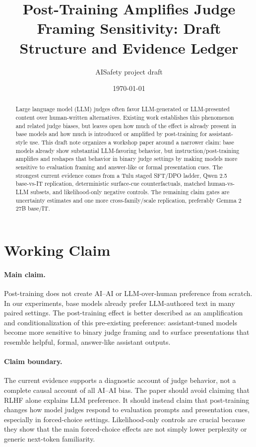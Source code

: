 \documentclass[11pt]{article}
\title{Post-Training Amplifies Judge Framing Sensitivity: Draft Structure and Evidence Ledger}
\author{AISafety project draft}
\date{\today}
\begin{document}
\maketitle

\begin{abstract}
Large language model (LLM) judges often favor LLM-generated or LLM-presented
content over human-written alternatives. Existing work establishes this
phenomenon and related judge biases, but leaves open how much of the effect is
already present in base models and how much is introduced or amplified by
post-training for assistant-style use. This draft note organizes a workshop
paper around a narrower claim: base models already show substantial
LLM-favoring behavior, but instruction/post-training amplifies and reshapes
that behavior in binary judge settings by making models more sensitive to
evaluation framing and answer-like or formal presentation cues. The strongest
current evidence comes from a Tulu staged SFT/DPO ladder, Qwen 2.5 base-vs-IT
replication, deterministic surface-cue counterfactuals, matched
human-vs-LLM subsets, and likelihood-only negative controls. The remaining
claim gates are uncertainty estimates and one more cross-family/scale
replication, preferably Gemma 2 27B base/IT.
\end{abstract}

\section{Working Claim}

\paragraph{Main claim.}
Post-training does not create AI--AI or LLM-over-human preference from
scratch. In our experiments, base models already prefer LLM-authored text in
many paired settings. The post-training effect is better described as an
amplification and conditionalization of this pre-existing preference:
assistant-tuned models become more sensitive to binary judge framing and to
surface presentations that resemble helpful, formal, answer-like assistant
outputs.

\paragraph{Claim boundary.}
The current evidence supports a diagnostic account of judge behavior, not a
complete causal account of all AI--AI bias. The paper should avoid claiming
that RLHF alone explains LLM preference. It should instead claim that
post-training changes how model judges respond to evaluation prompts and
presentation cues, especially in forced-choice settings. Likelihood-only
controls are crucial because they show that the main forced-choice effects are
not simply lower perplexity or generic next-token familiarity.
\end{document}
